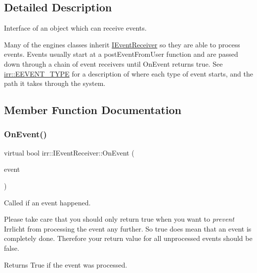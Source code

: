 \subsection{Detailed Description}
Interface of an object which can receive events. 

Many of the engine\textquotesingle{}s classes inherit \hyperlink{classirr_1_1IEventReceiver}{I\+Event\+Receiver} so they are able to process events. Events usually start at a post\+Event\+From\+User function and are passed down through a chain of event receivers until On\+Event returns true. See \hyperlink{namespaceirr_ac9eed96e06e85ce3c86fcbbbe9e48a0c}{irr\+::\+E\+E\+V\+E\+N\+T\+\_\+\+T\+Y\+PE} for a description of where each type of event starts, and the path it takes through the system. 

\subsection{Member Function Documentation}
\mbox{\label{classirr_1_1IEventReceiver_a571f744ceffc3b4fe8a81f529163eb97}} 
\subsubsection{\texorpdfstring{On\+Event()}{OnEvent()}}
{\footnotesize\ttfamily virtual bool irr\+::\+I\+Event\+Receiver\+::\+On\+Event (\begin{DoxyParamCaption}\item[{const \hyperlink{structirr_1_1SEvent}{S\+Event} \&}]{event }\end{DoxyParamCaption})\hspace{0.3cm}{\ttfamily [pure virtual]}}



Called if an event happened. 

Please take care that you should only return \textquotesingle{}true\textquotesingle{} when you want to {\itshape prevent} Irrlicht from processing the event any further. So \textquotesingle{}true\textquotesingle{} does mean that an event is completely done. Therefore your return value for all unprocessed events should be \textquotesingle{}false\textquotesingle{}. \begin{DoxyReturn}{Returns}
True if the event was processed. 
\end{DoxyReturn}


